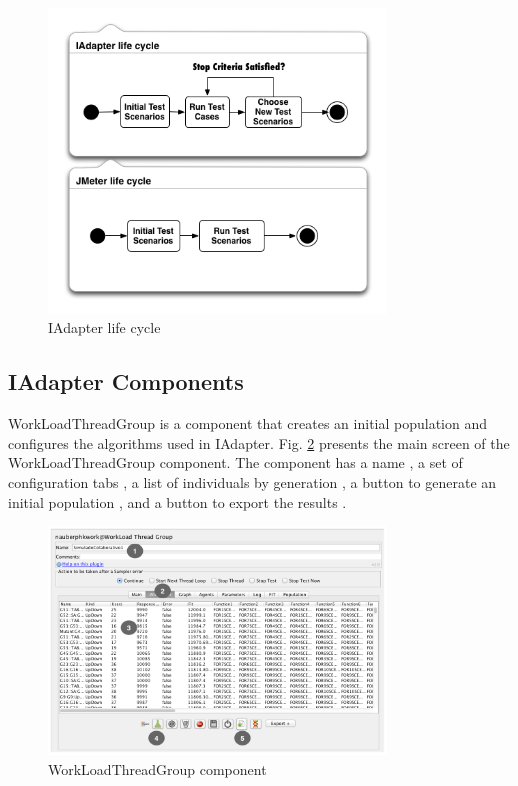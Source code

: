 \begin{figure}[h]
\centering
\includegraphics[width=0.8\textwidth]{./images/lifecycle2.png}
\caption{IAdapter life cycle}
\label{fig:iadapterlifecycle}
\end{figure}

\subsection{IAdapter Components}
 
WorkLoadThreadGroup is a component that creates an initial population and configures the algorithms used in IAdapter. Fig. \ref{fig:tela1iadapter} presents the main screen of the WorkLoadThreadGroup component. The component has a name , a set of configuration tabs , a list of individuals by generation , a button to generate an initial population , and a button to export the results .

\begin{figure}[h]
\centering
\includegraphics[width=0.8\textwidth]{./images/tela1iadapter.png}
\caption{WorkLoadThreadGroup component}
\label{fig:tela1iadapter}
\end{figure}

